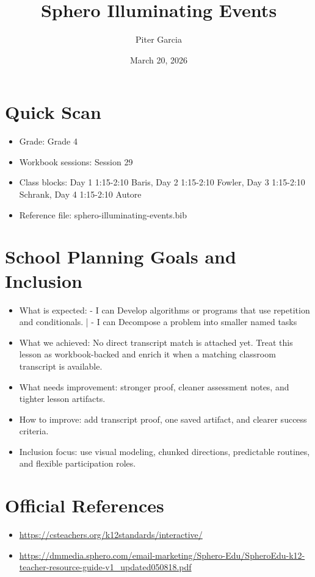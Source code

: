 \documentclass[11pt]{article}
\title{Sphero Illuminating Events}
\author{Piter Garcia}
\date{March 20, 2026}
\begin{document}
    \maketitle
    \section*{Quick Scan}
    \begin{itemize}[leftmargin=*]
    \item Grade: Grade 4
    \item Workbook sessions: Session 29
    \item Class blocks: Day 1 1:15-2:10 Baris, Day 2 1:15-2:10 Fowler, Day 3 1:15-2:10 Schrank, Day 4 1:15-2:10 Autore
    \item Reference file: sphero-illuminating-events.bib
    \end{itemize}
    \section*{School Planning Goals and Inclusion}
    \begin{itemize}[leftmargin=*]
    \item What is expected: - I can Develop algorithms or programs that use repetition and conditionals. | - I can Decompose a problem into smaller named tasks
    \item What we achieved: No direct transcript match is attached yet. Treat this lesson as workbook-backed and enrich it when a matching classroom transcript is available.
    \item What needs improvement: stronger proof, cleaner assessment notes, and tighter lesson artifacts.
    \item How to improve: add transcript proof, one saved artifact, and clearer success criteria.
    \item Inclusion focus: use visual modeling, chunked directions, predictable routines, and flexible participation roles.
    \end{itemize}
    \section*{Official References}
    \begin{itemize}[leftmargin=*]
    \item \url{https://csteachers.org/k12standards/interactive/}
\item \url{https://dmmedia.sphero.com/email-marketing/Sphero-Edu/SpheroEdu-k12-teacher-resource-guide-v1_updated050818.pdf}

    \end{itemize}
    
\end{document}
